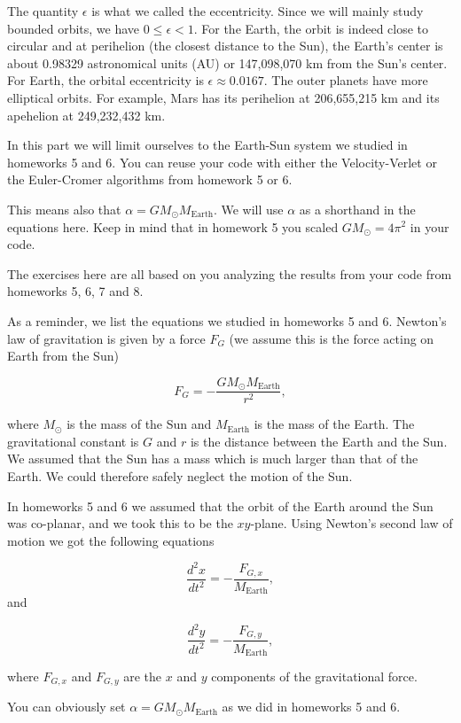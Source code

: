 \documentclass[%
oneside,                 %
final,                   %
10pt]{article}
\begin{document}
The quantity $\epsilon$ is what we called the eccentricity. Since we
will mainly study bounded orbits, we have $0 \le \epsilon < 1$.  For
the Earth, the orbit is indeed close to circular and at perihelion
(the closest distance to the Sun), the Earth's center is about 0.98329
astronomical units (AU) or 147,098,070 km from the Sun's center. For
Earth, the orbital eccentricity is $\epsilon\approx 0.0167$. The outer
planets have more elliptical orbits. For example, Mars has its
perihelion at 206,655,215 km and its apehelion at 249,232,432 km.

In this part we will limit ourselves to the Earth-Sun system we
studied in homeworks 5 and 6. You can reuse your code with either the
Velocity-Verlet or the Euler-Cromer algorithms from homework 5 or 6.

This means also that $\alpha=GM_{\odot}M_{\mathrm{Earth}}$. We will
use $\alpha$ as a shorthand in the equations here. Keep in mind that
in homework 5 you scaled $GM_{\odot}=4\pi^2$ in your code.

The exercises here are all based on you analyzing the results from your code from homeworks 5, 6, 7 and 8.

As a reminder, we list the equations we studied in homeworks 5 and 6.
Newton's law of gravitation is given by a force $F_G$ (we assume this
is the force acting on Earth from the Sun)

\[
F_G=-\frac{GM_{\odot}M_{\mathrm{Earth}}}{r^2},
\]

where $M_{\odot}$ is the mass of the Sun and $M_{\mathrm{Earth}}$ is
the mass of the Earth. The gravitational constant is $G$ and $r$ is
the distance between the Earth and the Sun.  We assumed that the Sun
has a mass which is much larger than that of the Earth. We could
therefore safely neglect the motion of the Sun.

In homeworks 5 and 6 we assumed that the orbit of the Earth around the Sun 
was co-planar, and we took this to be the $xy$-plane.
Using Newton's second law of motion we got the following equations

\[
\frac{d^2x}{dt^2}=-\frac{F_{G,x}}{M_{\mathrm{Earth}}},
\]
and

\[
\frac{d^2y}{dt^2}=-\frac{F_{G,y}}{M_{\mathrm{Earth}}},
\]

where $F_{G,x}$ and $F_{G,y}$ are the $x$ and $y$ components of the
gravitational force.

You can obviously set $\alpha=GM_{\odot}M_{\mathrm{Earth}}$ as we did in homeworks 5 and 6.
\end{document}
